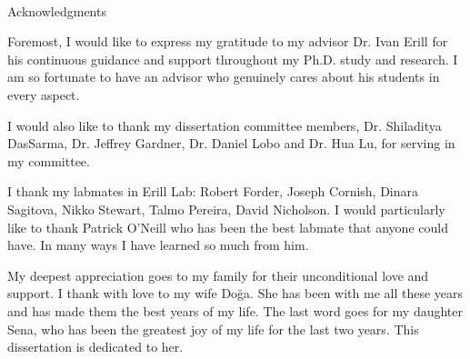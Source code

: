 
\renewcommand{\baselinestretch}{2}
\small\normalsize
\hbox{\ }

\vspace{-.65in}

\begin{center}
\large{Acknowledgments}
\end{center}

\vspace{1ex}

Foremost, I would like to express my gratitude to my advisor Dr. Ivan Erill for
his continuous guidance and support throughout my Ph.D. study and research. I
am so fortunate to have an advisor who genuinely cares about his students in
every aspect.

I would also like to thank my dissertation committee members, Dr. Shiladitya
DasSarma, Dr. Jeffrey Gardner, Dr. Daniel Lobo and Dr. Hua Lu, for serving in
my committee.

I thank my labmates in Erill Lab: Robert Forder, Joseph Cornish, Dinara
Sagitova, Nikko Stewart, Talmo Pereira, David Nicholson. I would particularly
like to thank Patrick O'Neill who has been the best labmate that anyone could
have. In many ways I have learned so much from him.

My deepest appreciation goes to my family for their unconditional love and
support. I thank with love to my wife Doğa. She has been with me all these
years and has made them the best years of my life. The last word goes for my
daughter Sena, who has been the greatest joy of my life for the last two
years. This dissertation is dedicated to her.
